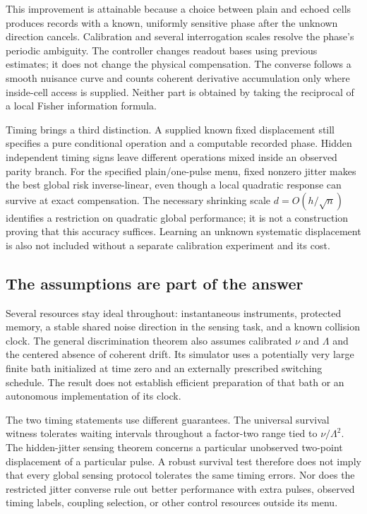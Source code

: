 \documentclass[11pt,a4paper]{article}
\numberwithin{equation}{section}
\theoremstyle{remark}
\begin{document}
This improvement is attainable because a choice between plain and echoed
cells produces records with a known, uniformly sensitive phase after the
unknown direction cancels. Calibration and several interrogation scales
resolve the phase's periodic ambiguity. The controller changes readout
bases using previous estimates; it does not change the physical
compensation. The converse follows a smooth nuisance curve and counts
coherent derivative accumulation only where inside-cell access is supplied.
Neither part is obtained by taking the reciprocal of a local Fisher
information formula.

Timing brings a third distinction. A supplied known fixed displacement
still specifies a pure conditional operation and a computable recorded
phase. Hidden independent timing signs leave different operations mixed
inside an observed parity branch. For the specified plain/one-pulse menu,
fixed nonzero jitter makes the best global risk inverse-linear, even
though a local quadratic response can survive at exact compensation.
The necessary shrinking scale $d=O(h/\sqrt n)$ identifies a restriction on
quadratic global performance; it is not a construction proving that this
accuracy suffices. Learning an unknown systematic displacement is also
not included without a separate calibration experiment and its cost.

\subsection{The assumptions are part of the answer}

Several resources stay ideal throughout: instantaneous instruments,
protected memory, a stable shared noise direction in the sensing task,
and a known collision clock. The general discrimination theorem also
assumes calibrated $\nu$ and $\Lambda$ and the centered absence of coherent
drift. Its simulator uses a potentially very large finite bath initialized
at time zero and an externally prescribed switching schedule. The result
does not establish efficient preparation of that bath or an autonomous
implementation of its clock.

The two timing statements use different guarantees. The universal survival
witness tolerates waiting intervals throughout a factor-two range tied to
$\nu/\Lambda^2$. The hidden-jitter sensing theorem concerns a particular
unobserved two-point displacement of a particular pulse. A robust survival
test therefore does not imply that every global sensing protocol tolerates
the same timing errors. Nor does the restricted jitter converse rule out
better performance with extra pulses, observed timing labels, coupling
selection, or other control resources outside its menu.
\end{document}
